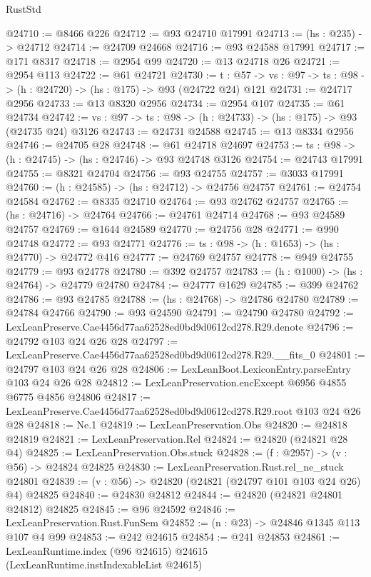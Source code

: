\begin{lexlean}{RustStd}
\begin{coremodule}
@24710 := @8466 @226
@24712 := @93 @24710 @17991
@24713 := (hs : @235) -> @24712
@24714 := @24709 @24668
@24716 := @93 @24588 @17991
@24717 := @171 @8317
@24718 := @2954 @99
@24720 := @13 @24718 @26
@24721 := @2954 @113
@24722 := @61 @24721
@24730 := {t : @57} ->
  {vs : @97} -> {ts : @98} -> (h : @24720) -> (hs : @175) -> @93 (@24722 @24) @121
@24731 := @24717 @2956
@24733 := @13 @8320 @2956
@24734 := @2954 @107
@24735 := @61 @24734
@24742 := {vs : @97} -> {ts : @98} -> (h : @24733) -> (hs : @175) -> @93 (@24735 @24) @3126
@24743 := @24731 @24588
@24745 := @13 @8334 @2956
@24746 := @24705 @28
@24748 := @61 @24718 @24697
@24753 := {ts : @98} -> (h : @24745) -> (hs : @24746) -> @93 @24748 @3126
@24754 := @24743 @17991
@24755 := @8321 @24704
@24756 := @93 @24755
@24757 := @3033 @17991
@24760 := (h : @24585) -> (hs : @24712) -> @24756 @24757
@24761 := @24754 @24584
@24762 := @8335 @24710
@24764 := @93 @24762 @24757
@24765 := (hs : @24716) -> @24764
@24766 := @24761 @24714
@24768 := @93 @24589 @24757
@24769 := @1644 @24589
@24770 := @24756 @28
@24771 := @990 @24748
@24772 := @93 @24771
@24776 := {ts : @98} -> (h : @1653) -> (hs : @24770) -> @24772 @416
@24777 := @24769 @24757
@24778 := @949 @24755
@24779 := @93 @24778
@24780 := @392 @24757
@24783 := (h : @1000) -> (hs : @24764) -> @24779 @24780
@24784 := @24777 @1629
@24785 := @399 @24762
@24786 := @93 @24785
@24788 := (hs : @24768) -> @24786 @24780
@24789 := @24784 @24766
@24790 := @93 @24590
@24791 := @24790 @24780
@24792 := LexLeanPreserve.Cae4456d77aa62528ed0bd9d0612cd278.R29.denote
@24796 := @24792 @103 @24 @26 @28
@24797 := LexLeanPreserve.Cae4456d77aa62528ed0bd9d0612cd278.R29.__fits_0
@24801 := @24797 @103 @24 @26 @28
@24806 := LexLeanBoot.LexiconEntry.parseEntry @103 @24 @26 @28
@24812 := LexLeanPreservation.encExcept @6956 @4855 @6775 @4856 @24806
@24817 := LexLeanPreserve.Cae4456d77aa62528ed0bd9d0612cd278.R29.root @103 @24 @26 @28
@24818 := Ne.{1}
@24819 := LexLeanPreservation.Obs
@24820 := @24818 @24819
@24821 := LexLeanPreservation.Rel
@24824 := @24820 (@24821 @28 @4)
@24825 := LexLeanPreservation.Obs.stuck
@24828 := (f : @2957) -> (v : @56) -> @24824 @24825
@24830 := LexLeanPreservation.Rust.rel_ne_stuck @24801
@24839 := (v : @56) -> @24820 (@24821 (@24797 @101 @103 @24 @26) @4) @24825
@24840 := @24830 @24812
@24844 := @24820 (@24821 @24801 @24812) @24825
@24845 := @96 @24592
@24846 := LexLeanPreservation.Rust.FunSem
@24852 := (n : @23) -> @24846 @1345 @113 @107 @4 @99
@24853 := @242 @24615
@24854 := @241 @24853
@24861 := LexLeanRuntime.index (@96 @24615) @24615 (LexLeanRuntime.instIndexableList @24615)

\end{coremodule}
\end{lexlean}
